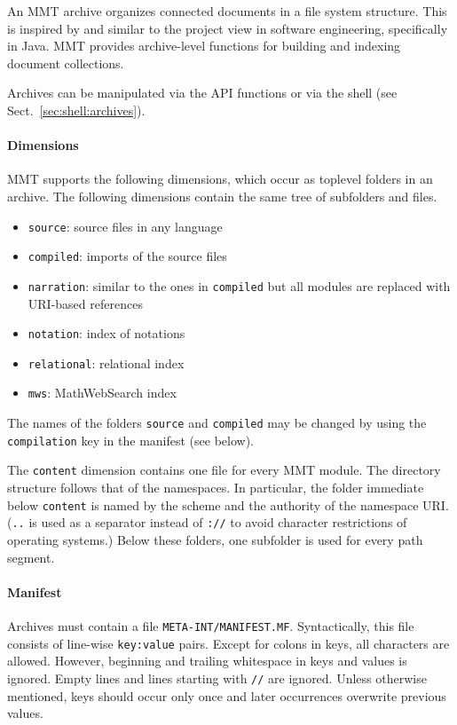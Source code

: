 An MMT archive \cite{HIJKR:dimensions:11} organizes connected documents in a file system structure. This is inspired by and similar to the project view in software engineering, specifically in Java. MMT provides archive-level functions for building and indexing document collections.

Archives can be manipulated via the API functions or via the shell (see Sect.~\ref{sec:shell:archives}).

\paragraph{Dimensions}
MMT supports the following dimensions, which occur as toplevel folders in an archive.
The following dimensions contain the same tree of subfolders and files.
\begin{itemize}
 \item \texttt{source}: source files in any language
 \item \texttt{compiled}: {\mmt} imports of the source files
 \item \texttt{narration}: similar to the ones in \texttt{compiled} but all {\mmt} modules are replaced with {\mmt} URI-based references
 \item \texttt{notation}: index of notations
 \item \texttt{relational}: relational index
 \item \texttt{mws}: MathWebSearch \cite{mathwebsearch} index
\end{itemize}
The names of the folders \texttt{source} and \texttt{compiled} may be changed by using the \texttt{compilation} key in the manifest (see below).

The \texttt{content} dimension contains one file for every MMT module. The directory structure follows that of the {\mmt} namespaces. In particular, the folder immediate below \texttt{content} is named by the scheme and the authority of the namespace URI. (\texttt{..} is used as a separator instead of \texttt{://} to avoid character restrictions of operating systems.) Below these folders, one subfolder is used for every path segment.

\paragraph{Manifest}
Archives must contain a file \texttt{META-INT/MANIFEST.MF}. Syntactically, this file consists of line-wise \texttt{key:value} pairs. Except for colons in keys, all characters are allowed. However, beginning and trailing whitespace in keys and values is ignored. Empty lines and lines starting with \texttt{//} are ignored.
Unless otherwise mentioned, keys should occur only once and later occurrences overwrite previous values.

